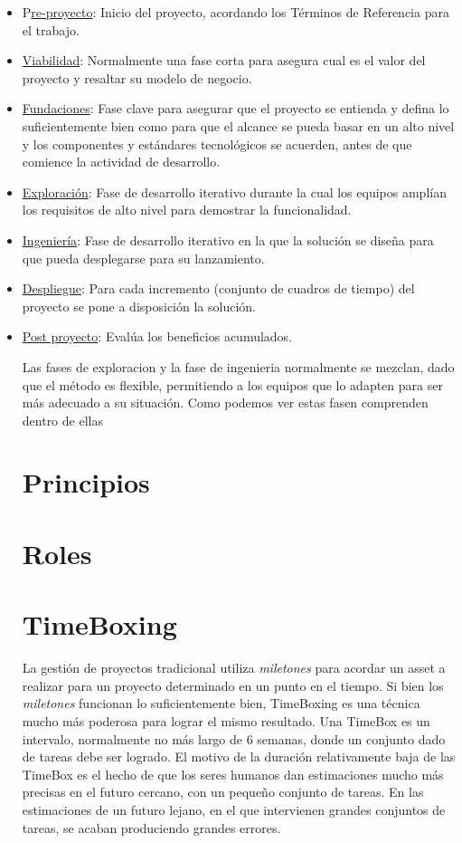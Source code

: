 \documentclass[12pt,a4paper]{article}
\begin{document}
\begin{itemize}
	\item P\underline{re-proyecto}: Inicio del proyecto, acordando los Términos de Referencia para el trabajo.
	\item \underline{Viabilidad}:
	Normalmente una fase corta para asegura cual es el valor del proyecto y resaltar su modelo de negocio.
	\item \underline{Fundaciones}: Fase clave para asegurar que el proyecto se entienda y defina lo suficientemente bien como para que el alcance se pueda basar en un alto nivel y los componentes y estándares tecnológicos se acuerden, antes de que comience la actividad de desarrollo.

\item \underline{Exploración}: Fase de desarrollo iterativo durante la cual los equipos amplían los requisitos de alto nivel para demostrar la funcionalidad.

\item \underline{Ingeniería}: Fase de desarrollo iterativo en la que la solución se diseña para que pueda desplegarse para su lanzamiento.

\item \underline{Despliegue}: Para cada incremento (conjunto de cuadros de tiempo) del proyecto se pone a disposición la solución.

 \item \underline{Post proyecto}: Evalúa los beneficios acumulados.

Las fases de exploracion y la fase de ingenieria normalmente se mezclan, dado que el método es flexible, permitiendo a los equipos que lo adapten para ser más adecuado a su situación. Como podemos ver estas fasen comprenden dentro de ellas 


\section{Principios}

\section{Roles}

\section{TimeBoxing}
La gestión de proyectos tradicional utiliza \emph{miletones} para acordar un asset a realizar para un proyecto determinado en un punto en el tiempo. Si bien los  \emph{miletones} funcionan lo suficientemente bien, TimeBoxing es una técnica mucho más poderosa para lograr el mismo resultado. Una TimeBox es un intervalo, normalmente no más largo de 6 semanas, donde un conjunto dado de tareas debe ser logrado. El motivo de la duración relativamente baja de las TimeBox es el hecho de que los seres humanos dan estimaciones mucho más precisas en el futuro cercano, con un pequeño conjunto de tareas.
En las estimaciones de un futuro lejano, en el que intervienen grandes conjuntos de tareas, se acaban produciendo grandes errores.\\


\end{itemize}
\end{document}
